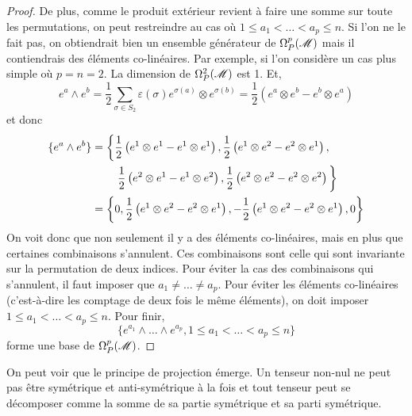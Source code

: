 \documentclass[a4paper,11pt]{report}
\begin{document}
\begin{proof}
                De plus, comme le produit extérieur revient à faire une somme sur toute les permutations, on peut restreindre au cas où $1\leq a_1<\dots<a_p\leq n$. Si l'on ne le fait pas, on obtiendrait bien un ensemble générateur de $\Omega_P^p(\mathscr{M})$ mais il contiendrais des éléments co-linéaires. Par exemple, si l'on considère un cas plus simple où $p=n=2$. La dimension de $\Omega_P^2(\mathscr{M})$ est 1. Et,
                \begin{equation}
                    e^a\wedge e^b = \frac{1}{2}\sum_{\sigma\in S_2} \varepsilon(\sigma)e^{\sigma(a)}\otimes e^{\sigma(b)} = \frac{1}{2}\left( e^a\otimes e^b - e^b\otimes e^a \right)
                \end{equation}
                et donc
                \begin{align}
                    \{e^a\wedge e^b\} &= \bigg\{ 
                    \frac{1}{2}\left( e^1\otimes e^1 - e^1\otimes e^1 \right), \frac{1}{2}\left( e^1\otimes e^2 - e^2\otimes e^1 \right),\\
                    &\hspace{0.825cm}\frac{1}{2}\left( e^2\otimes e^1 - e^1\otimes e^2 \right),\frac{1}{2}\left( e^2\otimes e^2 - e^2\otimes e^2 \right) \bigg\} \\
                    &= \left\{ 
                    0, \frac{1}{2}\left( e^1\otimes e^2 - e^2\otimes e^1 \right),-\frac{1}{2}\left( e^1\otimes e^2 - e^2\otimes e^1 \right),0 \right\}
                \end{align}
                On voit donc que non seulement il y a des éléments co-linéaires, mais en plus que certaines combinaisons s'annulent. Ces combinaisons sont celle qui sont invariante sur la permutation de deux indices. Pour éviter la cas des combinaisons qui s'annulent, il faut imposer que $a_1\neq \dots\neq a_p$. Pour éviter les éléments co-linéaires (c'est-à-dire les comptage de deux fois le même éléments), on doit imposer $1\leq a_1<\dots<a_p\leq n$. Pour finir,
                \begin{equation}
                    \{e^{a_1}\wedge\dots \wedge e^{a_p},1\leq a_1<\dots<a_p\leq n\}
                \end{equation}
                forme une base de $\Omega_P^p(\mathscr{M})$.
            \end{proof}
            
            \begin{rmk}
                On peut voir que le principe de projection émerge. Un tenseur non-nul ne peut pas être symétrique et anti-symétrique à la fois et tout tenseur peut se décomposer comme la somme de sa partie symétrique et sa parti symétrique.
            \end{rmk}
            
\end{document}
